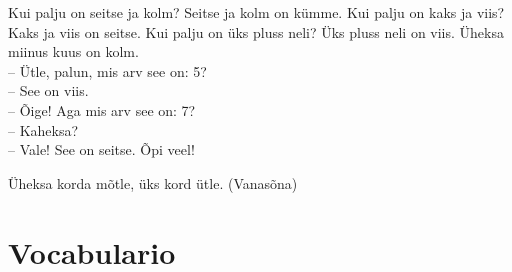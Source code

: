 Kui palju on seitse ja kolm? Seitse ja kolm on kümme. Kui palju on kaks ja viis? Kaks ja viis on seitse. Kui palju on üks pluss neli? Üks pluss neli on viis. Üheksa miinus kuus on kolm. \\

\noindent
-- Ütle, palun, mis arv see on: 5? \\
-- See on viis. \\
-- Õige! Aga mis arv see on: 7? \\
-- Kaheksa? \\ 
-- Vale! See on seitse. Õpi veel! \\

\begin{center}
Üheksa korda mõtle, üks kord ütle. (Vanasõna)
\end{center}

\Large{\section*{Vocabulario}}

